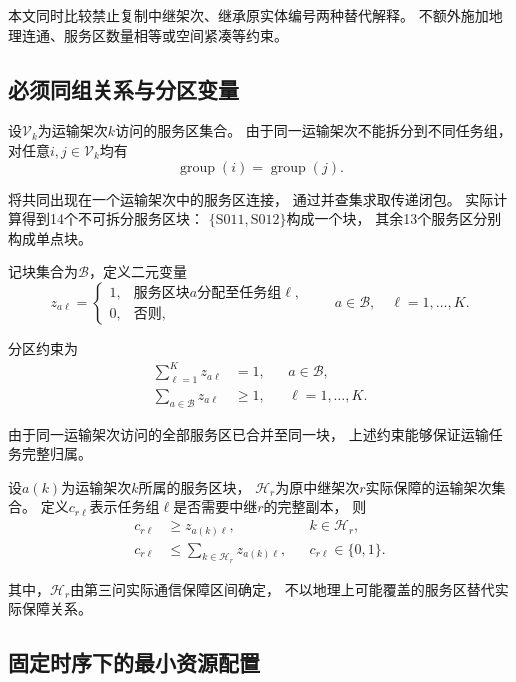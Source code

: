 \documentclass[bwprint]{gmcmthesis}
\begin{document}
本文同时比较禁止复制中继架次、继承原实体编号两种替代解释。
不额外施加地理连通、服务区数量相等或空间紧凑等约束。

\subsection{必须同组关系与分区变量}

设$\mathcal{V}_k$为运输架次$k$访问的服务区集合。
由于同一运输架次不能拆分到不同任务组，
对任意$i,j\in\mathcal{V}_k$均有
\begin{equation}
\operatorname{group}(i)=\operatorname{group}(j).
\end{equation}

将共同出现在一个运输架次中的服务区连接，
通过并查集求取传递闭包。
实际计算得到14个不可拆分服务区块：
$\{\mathrm{S011},\mathrm{S012}\}$构成一个块，
其余13个服务区分别构成单点块。

记块集合为$\mathcal{B}$，定义二元变量
\begin{equation}
z_{a\ell}=
\begin{cases}
1, & \text{服务区块$a$分配至任务组$\ell$},\\
0, & \text{否则},
\end{cases}
\qquad
a\in\mathcal{B},\quad \ell=1,\ldots,K.
\end{equation}

分区约束为
\begin{align}
\sum_{\ell=1}^{K}z_{a\ell}&=1,
&& a\in\mathcal{B},\\
\sum_{a\in\mathcal{B}}z_{a\ell}&\geq 1,
&& \ell=1,\ldots,K.
\end{align}

由于同一运输架次访问的全部服务区已合并至同一块，
上述约束能够保证运输任务完整归属。

设$a(k)$为运输架次$k$所属的服务区块，
$\mathcal{H}_r$为原中继架次$r$实际保障的运输架次集合。
定义$c_{r\ell}$表示任务组$\ell$是否需要中继$r$的完整副本，
则
\begin{align}
c_{r\ell}&\geq z_{a(k)\ell},
&& k\in\mathcal{H}_r,\\
c_{r\ell}&\leq
\sum_{k\in\mathcal{H}_r}z_{a(k)\ell},
&& c_{r\ell}\in\{0,1\}.
\end{align}

其中，$\mathcal{H}_r$由第三问实际通信保障区间确定，
不以地理上可能覆盖的服务区替代实际保障关系。

\subsection{固定时序下的最小资源配置}
\end{document}
